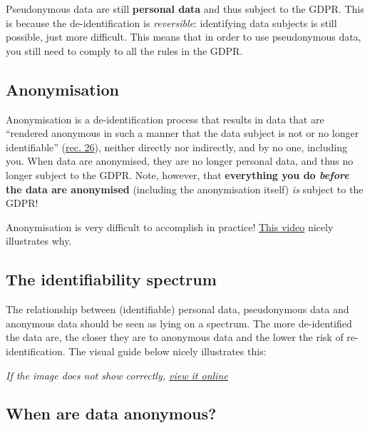 \documentclass[
]{book}
\begin{document}
Pseudonymous data are still \textbf{personal data} and thus subject to the GDPR. This
is because the de-identification is \emph{reversible}: identifying data subjects is
still possible, just more difficult. This means that in order to use
pseudonymous data, you still need to comply to all the rules in the GDPR.

\hypertarget{anonymisation}{%
\subsection{Anonymisation}\label{anonymisation}}

Anonymisation is a de-identification process that results in data that are
``rendered anonymous in such a manner that the data subject is not or no longer
identifiable'' (\href{https://gdpr-info.eu/recitals/no-26/}{rec. 26}),
neither directly nor indirectly, and by no one, including you. When data are
anonymised, they are no longer personal data, and thus no longer subject to the
GDPR. Note, however, that \textbf{everything you do \emph{before} the data are anonymised}
(including the anonymisation itself) \emph{is} subject to the GDPR!

Anonymisation is very difficult to accomplish in practice!
\href{https://www.youtube.com/watch?v=puQvpyf0W-M}{This video}
nicely illustrates why.

\hypertarget{identifiability-spectrum}{%
\subsection{The identifiability spectrum}\label{identifiability-spectrum}}

The relationship between (identifiable) personal data, pseudonymous data and
anonymous data should be seen as lying on a spectrum. The more de-identified the
data are, the closer they are to anonymous data and the lower the risk of
re-identification. The visual guide below nicely illustrates this:



\emph{If the image does not show correctly,
\href{https://fpf.org/wp-content/uploads/2017/06/FPF_Visual-Guide-to-Practical-Data-DeID.pdf}{view it online}}

\hypertarget{when-anonymous}{%
\subsection{When are data anonymous?}\label{when-anonymous}}
\end{document}
